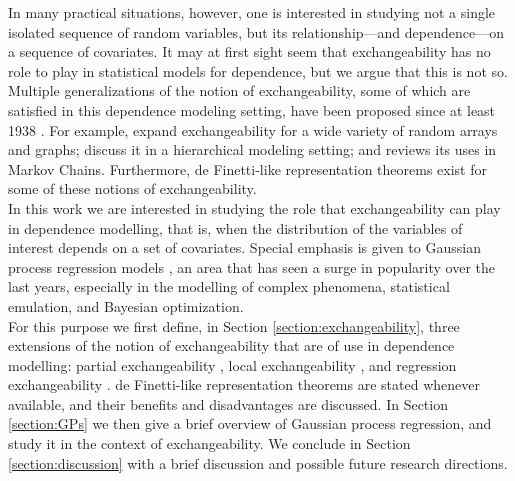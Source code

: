 In many practical situations, however, one is interested in studying not a single isolated sequence of random variables, but its relationship---and dependence---on a sequence of covariates. It may at first sight seem that exchangeability has no role to play in statistical models for dependence, but we argue that this is not so. Multiple generalizations of the notion of exchangeability, some of which are satisfied in this dependence modeling setting, have been proposed since at least 1938 \cite{deFinetti:1938:partial_exch}. For example, \cite{Aldous:2010, Orbanz:Roy:2015} expand exchangeability for a wide variety of random arrays and graphs; \cite{Bernardo:1996:Exch, CamerlenghiEtAl:2019:partial_exchang_hierarchical} discuss it in a hierarchical modeling setting; and \cite{Diaconis:1988:PartialExchang} reviews its uses in Markov Chains. Furthermore, de Finetti-like representation theorems exist for some of these notions of exchangeability. 
\\


In this work we are interested in studying the role that exchangeability can play in dependence modelling, that is, when the distribution of the variables of interest depends on a set of covariates. Special emphasis is given to Gaussian process regression models \cite{RasmussenWilliams:2006}, an area that has seen a surge in popularity over the last years, especially in the modelling of complex phenomena, statistical emulation, and Bayesian optimization.
\\


For this purpose we first define, in Section \ref{section:exchangeability}, three extensions of the notion of exchangeability that are of use in dependence modelling: partial exchangeability \cite{deFinetti:1938:partial_exch}, local exchangeability \cite{CampbellEtAl:2019:LocalExch}, and regression exchangeability \cite{McCullagh:2005:ExchAndReg}. de Finetti-like representation theorems are stated whenever available, and their benefits and disadvantages are discussed. In Section \ref{section:GPs} we then give a brief overview of Gaussian process regression, and study it in the context of exchangeability. We conclude in Section \ref{section:discussion} with a brief discussion and possible future research directions.





